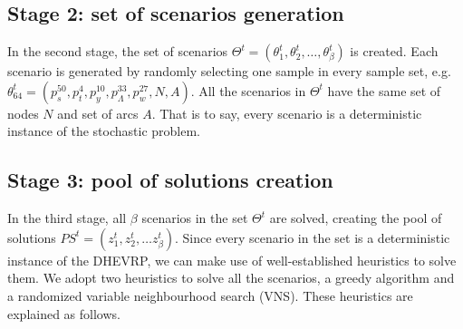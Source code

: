 \documentclass[11pt]{article}
\begin{document}
\subsection{Stage 2: set of scenarios generation}
\label{section:step2}
In the second stage, the set of scenarios $\Theta^t = (\theta^t_1, \theta^t_2, \ldots , \theta^t_{\beta})$ is created. Each scenario is generated by randomly selecting one sample in every sample set, e.g. $\theta^t_{64} = (p^{50}_s, p^4_t, p^{10}_y, p^{33}_{\Lambda}, p^{27}_w, N, A)$. All the scenarios in $\Theta^t$ have the same set of nodes $N$ and set of arcs $A$. That is to say, every scenario is a deterministic instance of the stochastic problem.


\subsection{Stage 3: pool of solutions creation}
\label{section:stage3}
In the third stage, all $\beta$ scenarios in the set $\Theta^t$ are solved, creating the pool of solutions $PS^t = (z^t_1, z^t_2, \dots z^t_{\beta})$. Since every scenario in the set is a deterministic instance of the DHEVRP, we can make use of well-established heuristics to solve them. We adopt two heuristics to solve all the scenarios, a greedy algorithm and a randomized variable neighbourhood search (VNS). These heuristics are explained as follows.
\end{document}
